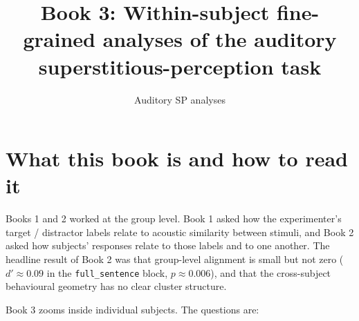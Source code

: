 \documentclass[11pt]{article}
\title{Book 3: Within-subject fine-grained analyses of the auditory
       superstitious-perception task}
\author{Auditory SP analyses}
\date{}
\begin{document}
\maketitle
\tableofcontents
\bigskip

\section{What this book is and how to read it}

Books 1 and 2 worked at the group level. Book 1 asked how the experimenter's
target / distractor labels relate to acoustic similarity between stimuli, and
Book 2 asked how subjects' responses relate to those labels and to one
another. The headline result of Book 2 was that group-level alignment is
small but not zero ($d'\approx 0.09$ in the \texttt{full\_sentence} block,
$p\!\approx\!0.006$), and that the cross-subject behavioural geometry has no
clear cluster structure.

Book 3 zooms inside individual subjects. The questions are:
\end{document}
